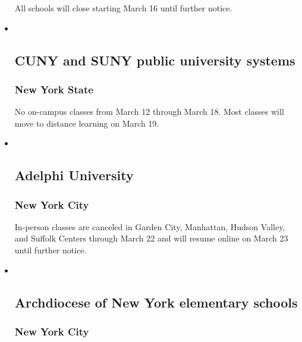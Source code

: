 \begin{itemize}
  \hypertarget{-2}{%
  \subsubsection{}\label{-2}}

  All schools will close starting March 16 until further notice.
\item ~
  \hypertarget{cuny-and-suny-public-university-systems}{%
  \subsection{CUNY and SUNY public university
  systems}\label{cuny-and-suny-public-university-systems}}

  \hypertarget{new-york-state}{%
  \subsubsection{New York State}\label{new-york-state}}

  No on-campus classes from March 12 through March 18. Most classes will
  move to distance learning on March 19.
\item ~
  \hypertarget{adelphi-university}{%
  \subsection{Adelphi University}\label{adelphi-university}}

  \hypertarget{new-york-city}{%
  \subsubsection{New York City}\label{new-york-city}}

  In-person classes are canceled in Garden City, Manhattan, Hudson
  Valley, and Suffolk Centers through March 22 and will resume online on
  March 23 until further notice.
\item ~
  \hypertarget{archdiocese-of-new-york-elementary-schools}{%
  \subsection{Archdiocese of New York elementary
  schools}\label{archdiocese-of-new-york-elementary-schools}}

  \hypertarget{new-york-city-1}{%
  \subsubsection{New York City}\label{new-york-city-1}}


\end{itemize}
